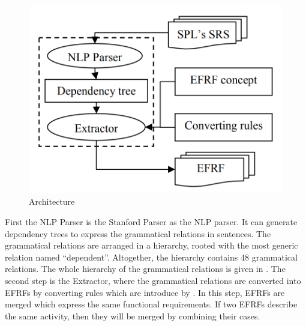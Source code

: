 \begin{multicols*}{2}
		\begin{minipage}{0.9\linewidth}
			\centering
			\begin{figure}[H]
				\includegraphics[width=\linewidth]{Architecture}
				\caption{Architecture}
			\end{figure}
		\end{minipage}
		
		First the NLP Parser is the Stanford Parser \cite{stanfordParser} as the NLP parser. It can generate dependency trees to express the
		grammatical relations in sentences. The grammatical relations are arranged in a hierarchy, rooted with the most generic relation named “dependent”. Altogether, the hierarchy
		contains 48 grammatical relations. The whole hierarchy of
		the grammatical relations is given in \cite{Marneffe}.
		The second step is the Extractor, where the grammatical relations are converted into \gls{EFRF}s by converting rules which are introduce by \cite{5381217}. In this step, \gls{EFRF}s are merged which express the
		same functional requirements. If two \gls{EFRF}s describe the same
		activity, then they will be merged by combining their cases. 
		
	\end{multicols*}


